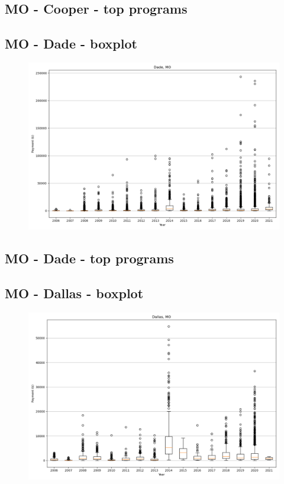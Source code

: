 \subsection*{MO - Cooper - top programs}

\newpage
\subsection*{MO - Dade - boxplot}
\begin{figure}[h]
\centering
\includegraphics[width=7in]{../output/boxplots/counties/Dade-MO_boxplot.png}
\end{figure}


\subsection*{MO - Dade - top programs}

\newpage
\subsection*{MO - Dallas - boxplot}
\begin{figure}[h]
\centering
\includegraphics[width=7in]{../output/boxplots/counties/Dallas-MO_boxplot.png}
\end{figure}


